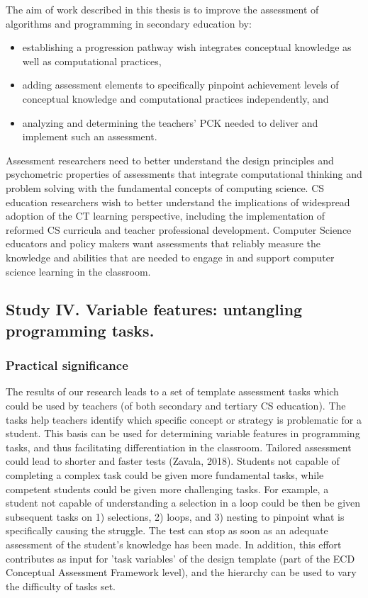 The aim of work described in this thesis is to improve the assessment of algorithms and programming in secondary education by:
\begin{itemize}
\item establishing a progression pathway wish integrates conceptual knowledge as well as computational practices,
\item adding assessment elements to specifically pinpoint achievement levels of conceptual knowledge and computational practices independently, and
\item analyzing and determining the teachers' PCK needed to deliver and implement such an assessment.
\end{itemize}


Assessment researchers need to better understand the design principles and psychometric properties of assessments that integrate computational thinking and problem solving with the fundamental concepts of computing science. CS education researchers wish to better understand the implications of widespread adoption of the CT learning perspective, including the implementation of reformed CS curricula and teacher professional development. Computer Science educators and policy makers want assessments that reliably measure the knowledge and abilities that are needed to engage in and support computer science learning in the classroom.




\subsection{Study IV. Variable features: untangling programming tasks.}
\subsubsection*{Practical significance}

The results of our research leads to a set of template assessment tasks which could be used by teachers (of both secondary and tertiary CS education). The tasks help teachers identify which specific concept or strategy is problematic for a student. This basis can be used for determining variable features in programming tasks, and thus facilitating differentiation in the classroom. Tailored assessment could lead to shorter and faster tests (Zavala, 2018). Students not capable of completing a complex task could be given more fundamental tasks, while competent students could be given more challenging tasks. For example, a student not capable of understanding a selection in a loop could be then be given subsequent tasks on 1) selections, 2) loops, and 3) nesting to pinpoint what is specifically causing the struggle. The test can stop as soon as an adequate assessment of the student’s knowledge has been made. In addition, this effort contributes as input for 'task variables' of the design template (part of the ECD Conceptual Assessment Framework level), and the hierarchy can be used to vary the difficulty of tasks set.




